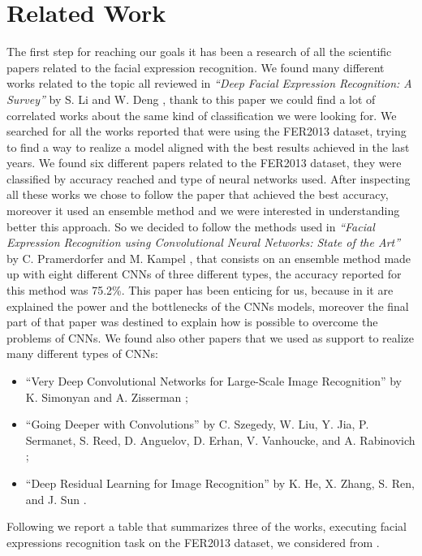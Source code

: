 \documentclass[10pt,twocolumn,letterpaper]{article}
\begin{document}
\section{Related Work}
The first step for reaching our goals it has been a research of all the scientific papers related to the facial expression recognition. We found many different works related to the topic all reviewed in \textit{``Deep Facial Expression Recognition: A Survey''} by S. Li and W. Deng \cite{paper}, thank to this paper we could find a lot of correlated works about the same kind of classification we were looking for. We searched for all the works reported that were using the FER2013 dataset, trying to find a way to realize a model aligned with the best results achieved in the last years. We found six different papers related to the FER2013 dataset, they were classified by accuracy reached and type of neural networks used. After inspecting all these works we chose to follow the paper that achieved the best accuracy, moreover it used an ensemble method and we were interested in understanding better this approach. So we decided to follow the methods used in \textit{``Facial Expression Recognition using Convolutional Neural Networks: State of the Art''} by C. Pramerdorfer and M. Kampel \cite{147}, that consists on an ensemble method made up  with eight different CNNs of three different types, the accuracy reported for this method was 75.2\%. This paper has been enticing for us, because in it are explained the power and the bottlenecks of the CNNs models, moreover the final part of that paper was destined to explain how is possible to overcome the problems of CNNs. We found also other papers that we used as support to realize many different types of CNNs:
\begin{itemize}
   \item ``Very Deep Convolutional Networks
         for Large-Scale Image Recognition'' by K. Simonyan and A. Zisserman \cite{24};
   \item ``Going Deeper with Convolutions'' by C. Szegedy, W. Liu, Y. Jia, P. Sermanet, S. Reed, D. Anguelov, D. Erhan,
         V. Vanhoucke, and A. Rabinovich \cite{13};
   \item ``Deep Residual Learning for Image Recognition'' by K. He, X. Zhang, S. Ren, and J. Sun \cite{5}.
\end{itemize}
Following we report a table that summarizes three of the works, executing facial expressions recognition task on the FER2013 dataset, we considered from \cite{paper}.
\end{document}
